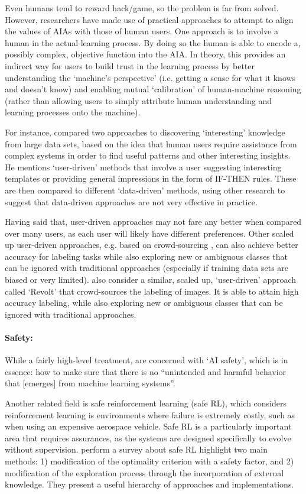 Even humans tend to reward hack/game, so the problem is far from solved. However, researchers have made use of practical approaches to attempt to align the values of AIAs with those of human users. One approach is to involve a human in the actual learning process. By doing so the human is able to encode a, possibly complex, objective function into the AIA. In theory, this provides an indirect way for users to build trust in the learning process by better understanding the `machine's perspective' (i.e. getting a sense for what it knows and doesn't know) and enabling mutual `calibration' of human-machine reasoning (rather than allowing users to simply attribute human understanding and learning processes onto the machine).

For instance, \citet{Freitas2006-qo} compared two approaches to discovering `interesting' knowledge from large data sets, based on the idea that human users require assistance from complex systems in order to find useful patterns and other interesting insights. He mentions `user-driven' methods that involve a user suggesting interesting templates or providing general impressions in the form of IF-THEN rules. These are then compared to different `data-driven' methods, using other research to suggest that data-driven approaches are not very effective in practice.

Having said that, user-driven approaches may not fare any better when compared over many users, as each user will likely have different preferences. Other scaled up user-driven approaches, e.g. based on crowd-sourcing \citet{Chang2017-kl}, can also achieve better accuracy for labeling tasks while also exploring new or ambiguous classes that can be ignored with traditional approaches (especially if training data sets are biased or very limited). \citet{Chang2017-kl} also consider a similar, scaled up, `user-driven' approach called `Revolt' that crowd-sources the labeling of images. It is able to attain high accuracy labeling, while also exploring new or ambiguous classes that can be ignored with traditional approaches.

\paragraph{Safety:}
While a fairly high-level treatment, \citet{Amodei2016-xi} are concerned with `AI safety', which is in essence: how to make sure that there is no ``unintended and harmful behavior that [emerges] from machine learning systems''.

Another related field is safe reinforcement learning (safe RL), which considers reinforcement learning is environments where failure is extremely costly, such as when using an expensive aerospace vehicle. Safe RL is a particularly important area that requires assurances, as the systems are designed specifically to evolve without supervision. \citet{Garcia2015-rs} perform a survey about safe RL highlight two main methods: 1) modification of the optimality criterion with a safety factor, and 2) modification of the exploration process through the incorporation of external knowledge. They present a useful hierarchy of approaches and implementations.

